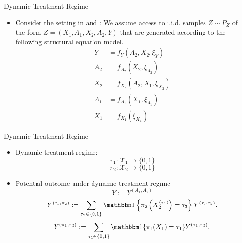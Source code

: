 \documentclass[aspectratio=169,xcolor=dvipsnames]{beamer}
\begin{document}
\begin{frame}{Dynamic Treatment Regime}
    \begin{itemize}
        \item Consider the setting in \citet*{chen2023inference} and \citet*{whitehouse2026inference}: We assume access to i.i.d. samples $Z \sim P_Z$ of the form $Z = (X_1,A_1,X_2,A_2, Y)$ that are generated according to the following structural equation model.
            \begin{align*}
                Y &= f_Y(A_2, X_2, \xi_Y)\\
                A_2 &= f_{A_2}(X_2, \xi_{A_2})\\
                X_2 &= f_{X_2}(A_2, X_1, \xi_{X_2})\\
                A_1 &= f_{A_1}(X_1, \xi_{A_1})\\
                X_1 &= f_{X_1}(\xi_{X_1})
            \end{align*}
    \end{itemize}
    \centering
\end{frame}

\begin{frame}{Dynamic Treatment Regime}
    \begin{itemize}
        \item Dynamic treatment regime:
            \[
            \pi_1:\mathcal{X}_1 \rightarrow \{0,1\}
            \]
            \[
            \pi_2:\mathcal{X}_2 \rightarrow \{0,1\}
            \]
    
        \item Potential outcome under dynamic treatment regime
            \[
                Y := Y^{(A_1, A_2)}
            \]
            \[
                Y^{(\tau_1,\pi_2)}
                :=
                \sum_{\tau_2\in\{0,1\}}
                \mathbbm 1\left\{\pi_2\left(X_2^{(\tau_1)}\right)=\tau_2\right\}
                Y^{(\tau_1,\tau_2)}.
            \]
            \[
                Y^{(\pi_1,\pi_2)}
                :=
                \sum_{\tau_1\in\{0,1\}}
                \mathbbm 1\{\pi_1(X_1)=\tau_1\}
                Y^{(\tau_1,\pi_2)}.
            \]
    \end{itemize}
\end{frame}
\end{document}
